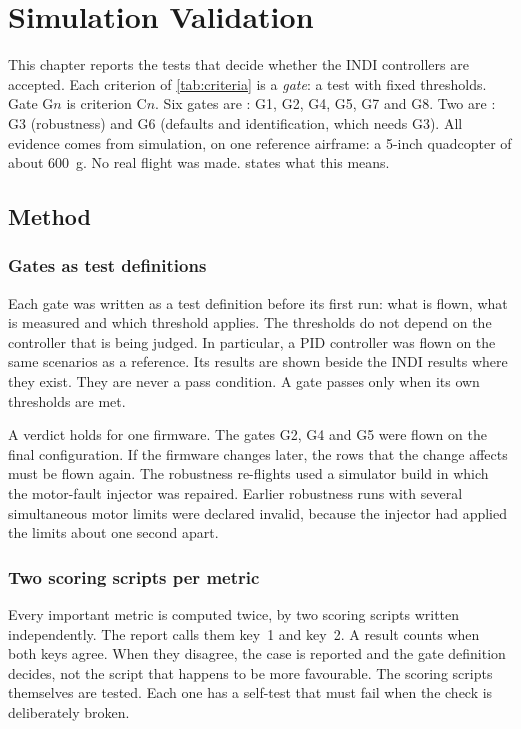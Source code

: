 \chapter{Simulation Validation}\label{ch:validation}

This chapter reports the tests that decide whether the INDI controllers are accepted.
Each criterion of \cref{tab:criteria} is a \emph{gate}: a test with fixed thresholds.
Gate G$n$ is criterion C$n$.
Six gates are \passed{}: G1, G2, G4, G5, G7 and G8.
Two are \notpassed{}: G3 (robustness) and G6 (defaults and identification, which needs G3).
All evidence comes from simulation, on one reference airframe: a 5-inch quadcopter of about 600~g.
No real flight was made.
 states what this means.

\section{Method}\label{sec:val_method}

\subsection{Gates as test definitions}\label{sec:val_gates}

Each gate was written as a test definition before its first run: what is flown, what is measured and which threshold applies.
The thresholds do not depend on the controller that is being judged.
In particular, a PID controller was flown on the same scenarios as a reference.
Its results are shown beside the INDI results where they exist.
They are never a pass condition.
A gate passes only when its own thresholds are met.

A verdict holds for one firmware.
The gates G2, G4 and G5 were flown on the final configuration.
If the firmware changes later, the rows that the change affects must be flown again.
The robustness re-flights used a simulator build in which the motor-fault injector was repaired.
Earlier robustness runs with several simultaneous motor limits were declared invalid, because the injector had applied the limits about one second apart.

\subsection{Two scoring scripts per metric}\label{sec:val_keys}

Every important metric is computed twice, by two scoring scripts written independently.
The report calls them key~1 and key~2.
A result counts when both keys agree.
When they disagree, the case is reported and the gate definition decides, not the script that happens to be more favourable.
The scoring scripts themselves are tested.
Each one has a self-test that must fail when the check is deliberately broken.

